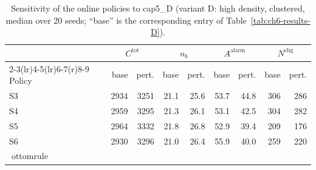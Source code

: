 \begin{table}[htbp]
\centering
\caption{Sensitivity of the online policies to cap5_D (variant D: high density, clustered,
median over 20 seeds; ``base'' is the corresponding entry of
Table~\ref{tab:ch6-results-D}).}
\label{tab:ch6-sens-D-cap5}
\footnotesize
\begin{tabular}{@{}l rr rr rr rr@{}}
\toprule
& \multicolumn{2}{c}{$C^{\mathrm{tot}}$} & \multicolumn{2}{c}{$n_b$}
  & \multicolumn{2}{c}{$A^{\mathrm{alarm}}$} & \multicolumn{2}{c}{$N^{\mathrm{chg}}$} \\
\cmidrule(r){2-3}\cmidrule(lr){4-5}\cmidrule(lr){6-7}\cmidrule(r){8-9}
Policy & base & pert. & base & pert. & base & pert. & base & pert. \\
\midrule

S3 & 2934 & 3251 & 21.1 & 25.6 & 53.7 & 44.8 & 306 & 286 \\
S4 & 2959 & 3295 & 21.3 & 26.1 & 53.1 & 42.5 & 304 & 282 \\
S5 & 2964 & 3332 & 21.8 & 26.8 & 52.9 & 39.4 & 209 & 176 \\
S6 & 2930 & 3296 & 21.0 & 26.4 & 55.9 & 40.0 & 259 & 220 \\
ottomrule
\end{tabular}
\end{table}
